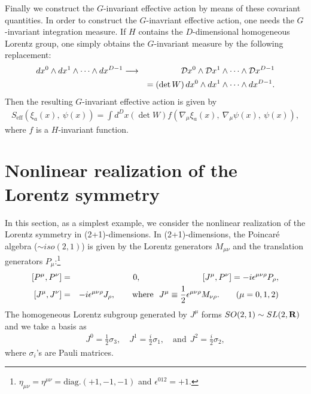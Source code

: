 \documentclass[a4paper,12pt]{article}
\begin{document}
Finally we construct the $G$-invariant effective action 
by means of these covariant quantities.
In order to construct the $G$-inavriant effective action, one needs 
the $G$-invariant integration measure. If $H$ contains 
the $D$-dimensional homogeneous Lorentz group, 
one simply obtains
the $G$-invariant measure by the following replacement: 
\begin{eqnarray}
dx^{0} \wedge dx^{1} \wedge \cdots \wedge d x^{D-1} \longrightarrow
&& {\cal D} x^{0} \wedge {\cal D} x^{1} \wedge \cdots 
\wedge {\cal D} x^{D-1} \\ 
&& = \left( \det W \right) dx^{0} \wedge dx^{1} \wedge 
\cdots \wedge d x^{D-1}.
\end{eqnarray}
Then the resulting $G$-invariant effective action is given by
\begin{eqnarray}
S_{\textrm{eff}}(\xi_{a}(x),~\psi(x)) = \int d^{D}x \left( \det W \right) 
f(\nabla_{\mu}\xi_{a}(x),~\nabla_{\mu}\psi(x),~\psi(x)),
\end{eqnarray}
where $f$ is a $H$-invariant function.    

\section{Nonlinear realization of the Lorentz symmetry}
In this section, as a simplest example, 
we consider the nonlinear realization of the Lorentz symmetry in
(2+1)-dimensions. In (2+1)-dimensions, the Poincar\'e algebra ($\sim
iso(2,1)$) is given by the Lorentz generators $M_{\mu \nu}$ and 
the translation generators $P_{\mu}$:\footnote{$\eta_{\mu \nu}=\eta^{\mu
\nu} = \textrm{diag.}(+1,-1,-1)$ and $\epsilon^{012}= +1$.}
\begin{eqnarray}
\left[ P^{\mu}, P^{\nu} \right] &=& 0, \hspace{2.6cm} \left[ J^{\mu}, 
P^{\nu} \right] = -i \epsilon^{\mu \nu \rho} P_{\rho}, \\  
\left[ J^{\mu}, J^{\nu} \right] &=& -i \epsilon^{\mu \nu \rho} J_{\rho}, 
\qquad \textrm{where}~~J^{\mu} \equiv \frac{1}{2} \epsilon^{\mu \nu
\rho} M_{\nu \rho}. \qquad (\mu = 0,1,2)
\end{eqnarray}
The homogeneous Lorentz subgroup 
generated by $J^{\mu}$ forms $SO(2,1) \sim SL(2, {\bf R})$
and we take a basis as 
\begin{eqnarray}
J^{0} = \frac{1}{2} \sigma_{3}, \quad J^{1} = \frac{i}{2} \sigma_{1},
\quad \textrm{and}~~ J^{2} = \frac{i}{2} \sigma_{2},
\end{eqnarray} 
where $\sigma_{i}$'s are Pauli matrices.
\end{document}
